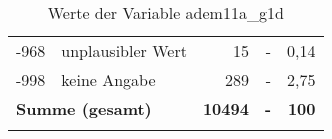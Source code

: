 \begin{longtable}{Xlrrr}
       -968 & unplausibler Wert & 15 & - & 0,14 \\

       -998 & keine Angabe & 289 & - & 2,75 \\

     \midrule
     \multicolumn{2}{l}{\textbf{Summe (gesamt)}} & \textbf{10494} & \textbf{-} & \textbf{100} \\
     \bottomrule
     \caption{Werte der Variable adem11a\_g1d}
     \end{longtable}
     
